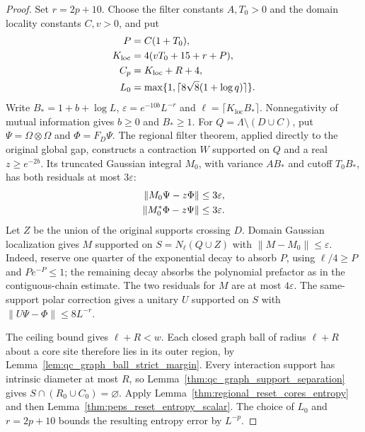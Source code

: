\begin{proof}\leanok
    Set $r=2p+10$. Choose the filter constants $A,T_0>0$ and the domain
    locality constants $C,v>0$, and put
    \begin{align}
        P                & =C(1+T_0),\notag                                \\
        K_{\mathrm{loc}} & =4(vT_0+15+r+P),\notag                          \\
        C_p              & =K_{\mathrm{loc}}+R+4,\notag                    \\
        L_0              & =\max\{1,\lceil8\sqrt8(1+\log q)\rceil\}.\notag
    \end{align}
    Write $B_*=1+b+\log L$, $\varepsilon=e^{-10b}L^{-r}$ and
    $\ell=\lceil K_{\mathrm{loc}}B_*\rceil$.
    Nonnegativity of mutual information gives $b\ge0$ and $B_*\ge1$.
    For $Q=\Lambda\setminus(D\cup C)$, put
    $\Psi=\Omega\otimes\Omega$ and $\Phi=F_D\Psi$.
    The regional filter theorem, applied directly to the original global gap,
    constructs a contraction $W$ supported on $Q$ and a real $z\ge e^{-2b}$.
    Its truncated Gaussian integral $M_0$, with variance $AB_*$ and cutoff
    $T_0B_*$, has both residuals at most $3\varepsilon$:
    \begin{align}
        \|M_0\Psi-z\Phi\|   & \le3\varepsilon,\notag \\
        \|M_0^*\Phi-z\Psi\| & \le3\varepsilon.\notag
    \end{align}
    Let $Z$ be the union of the original supports crossing $D$.
    Domain Gaussian localization gives $M$ supported on
    $S=N_\ell(Q\cup Z)$ with $\|M-M_0\|\le\varepsilon$.
    Indeed, reserve one quarter of the exponential decay to absorb $P$,
    using $\ell/4\ge P$ and $Pe^{-P}\le1$; the remaining decay absorbs the
    polynomial prefactor as in the contiguous-chain estimate.
    The two residuals for $M$ are at most $4\varepsilon$.
    The same-support polar correction gives a unitary $U$ supported on $S$
    with $\|U\Psi-\Phi\|\le8L^{-r}$.

    The ceiling bound gives $\ell+R<w$. Each closed graph ball of radius
    $\ell+R$ about a core site therefore lies in its outer region, by
    Lemma~\ref{lem:qc_graph_ball_strict_margin}.
    Every interaction support has intrinsic diameter at most $R$, so
    Lemma~\ref{thm:qc_graph_support_separation} gives
    $S\cap(R_0\cup C_0)=\varnothing$.
    Apply Lemma~\ref{thm:regional_reset_cores_entropy} and then
    Lemma~\ref{thm:peps_reset_entropy_scalar}. The choice of $L_0$ and
    $r=2p+10$ bounds the resulting entropy error by $L^{-p}$.
\end{proof}

